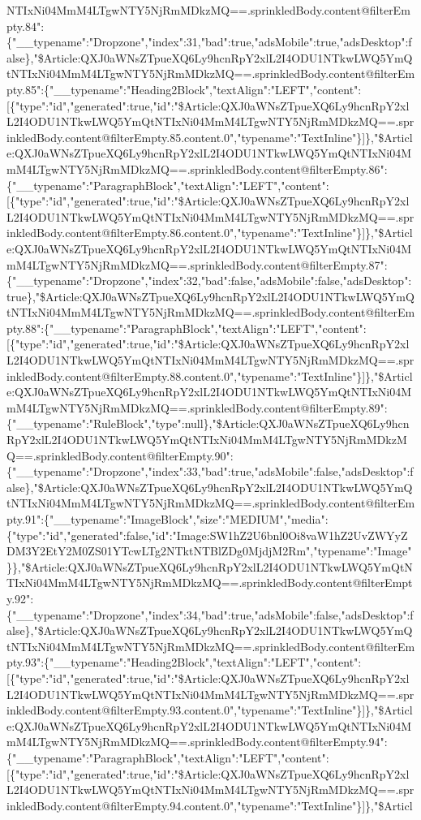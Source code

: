 NTIxNi04MmM4LTgwNTY5NjRmMDkzMQ==.sprinkledBody.content@filterEmpty.84":\{"\_\_typename":"Dropzone","index":31,"bad":true,"adsMobile":true,"adsDesktop":false\},"\$Article:QXJ0aWNsZTpueXQ6Ly9hcnRpY2xlL2I4ODU1NTkwLWQ5YmQtNTIxNi04MmM4LTgwNTY5NjRmMDkzMQ==.sprinkledBody.content@filterEmpty.85":\{"\_\_typename":"Heading2Block","textAlign":"LEFT","content":{[}\{"type":"id","generated":true,"id":"\$Article:QXJ0aWNsZTpueXQ6Ly9hcnRpY2xlL2I4ODU1NTkwLWQ5YmQtNTIxNi04MmM4LTgwNTY5NjRmMDkzMQ==.sprinkledBody.content@filterEmpty.85.content.0","typename":"TextInline"\}{]}\},"\$Article:QXJ0aWNsZTpueXQ6Ly9hcnRpY2xlL2I4ODU1NTkwLWQ5YmQtNTIxNi04MmM4LTgwNTY5NjRmMDkzMQ==.sprinkledBody.content@filterEmpty.86":\{"\_\_typename":"ParagraphBlock","textAlign":"LEFT","content":{[}\{"type":"id","generated":true,"id":"\$Article:QXJ0aWNsZTpueXQ6Ly9hcnRpY2xlL2I4ODU1NTkwLWQ5YmQtNTIxNi04MmM4LTgwNTY5NjRmMDkzMQ==.sprinkledBody.content@filterEmpty.86.content.0","typename":"TextInline"\}{]}\},"\$Article:QXJ0aWNsZTpueXQ6Ly9hcnRpY2xlL2I4ODU1NTkwLWQ5YmQtNTIxNi04MmM4LTgwNTY5NjRmMDkzMQ==.sprinkledBody.content@filterEmpty.87":\{"\_\_typename":"Dropzone","index":32,"bad":false,"adsMobile":false,"adsDesktop":true\},"\$Article:QXJ0aWNsZTpueXQ6Ly9hcnRpY2xlL2I4ODU1NTkwLWQ5YmQtNTIxNi04MmM4LTgwNTY5NjRmMDkzMQ==.sprinkledBody.content@filterEmpty.88":\{"\_\_typename":"ParagraphBlock","textAlign":"LEFT","content":{[}\{"type":"id","generated":true,"id":"\$Article:QXJ0aWNsZTpueXQ6Ly9hcnRpY2xlL2I4ODU1NTkwLWQ5YmQtNTIxNi04MmM4LTgwNTY5NjRmMDkzMQ==.sprinkledBody.content@filterEmpty.88.content.0","typename":"TextInline"\}{]}\},"\$Article:QXJ0aWNsZTpueXQ6Ly9hcnRpY2xlL2I4ODU1NTkwLWQ5YmQtNTIxNi04MmM4LTgwNTY5NjRmMDkzMQ==.sprinkledBody.content@filterEmpty.89":\{"\_\_typename":"RuleBlock","type":null\},"\$Article:QXJ0aWNsZTpueXQ6Ly9hcnRpY2xlL2I4ODU1NTkwLWQ5YmQtNTIxNi04MmM4LTgwNTY5NjRmMDkzMQ==.sprinkledBody.content@filterEmpty.90":\{"\_\_typename":"Dropzone","index":33,"bad":true,"adsMobile":false,"adsDesktop":false\},"\$Article:QXJ0aWNsZTpueXQ6Ly9hcnRpY2xlL2I4ODU1NTkwLWQ5YmQtNTIxNi04MmM4LTgwNTY5NjRmMDkzMQ==.sprinkledBody.content@filterEmpty.91":\{"\_\_typename":"ImageBlock","size":"MEDIUM","media":\{"type":"id","generated":false,"id":"Image:SW1hZ2U6bnl0Oi8vaW1hZ2UvZWYyZDM3Y2EtY2M0ZS01YTcwLTg2NTktNTBlZDg0MjdjM2Rm","typename":"Image"\}\},"\$Article:QXJ0aWNsZTpueXQ6Ly9hcnRpY2xlL2I4ODU1NTkwLWQ5YmQtNTIxNi04MmM4LTgwNTY5NjRmMDkzMQ==.sprinkledBody.content@filterEmpty.92":\{"\_\_typename":"Dropzone","index":34,"bad":true,"adsMobile":false,"adsDesktop":false\},"\$Article:QXJ0aWNsZTpueXQ6Ly9hcnRpY2xlL2I4ODU1NTkwLWQ5YmQtNTIxNi04MmM4LTgwNTY5NjRmMDkzMQ==.sprinkledBody.content@filterEmpty.93":\{"\_\_typename":"Heading2Block","textAlign":"LEFT","content":{[}\{"type":"id","generated":true,"id":"\$Article:QXJ0aWNsZTpueXQ6Ly9hcnRpY2xlL2I4ODU1NTkwLWQ5YmQtNTIxNi04MmM4LTgwNTY5NjRmMDkzMQ==.sprinkledBody.content@filterEmpty.93.content.0","typename":"TextInline"\}{]}\},"\$Article:QXJ0aWNsZTpueXQ6Ly9hcnRpY2xlL2I4ODU1NTkwLWQ5YmQtNTIxNi04MmM4LTgwNTY5NjRmMDkzMQ==.sprinkledBody.content@filterEmpty.94":\{"\_\_typename":"ParagraphBlock","textAlign":"LEFT","content":{[}\{"type":"id","generated":true,"id":"\$Article:QXJ0aWNsZTpueXQ6Ly9hcnRpY2xlL2I4ODU1NTkwLWQ5YmQtNTIxNi04MmM4LTgwNTY5NjRmMDkzMQ==.sprinkledBody.content@filterEmpty.94.content.0","typename":"TextInline"\}{]}\},"\$Articl